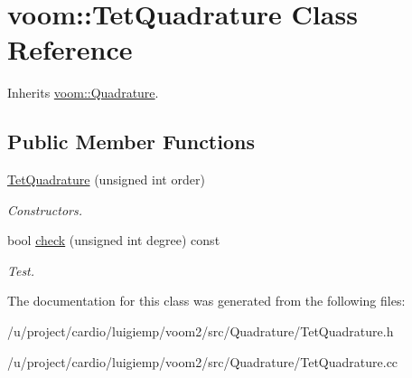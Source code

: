 \hypertarget{classvoom_1_1_tet_quadrature}{
\section{voom::TetQuadrature Class Reference}
\label{classvoom_1_1_tet_quadrature}
}


Inherits \hyperlink{classvoom_1_1_quadrature}{voom::Quadrature}.\subsection*{Public Member Functions}
\begin{DoxyCompactItemize}
\item 
\hypertarget{classvoom_1_1_tet_quadrature_afb15d49b3ab9b74e3e2cfb578df01edd}{
\hyperlink{classvoom_1_1_tet_quadrature_afb15d49b3ab9b74e3e2cfb578df01edd}{TetQuadrature} (unsigned int order)}
\label{classvoom_1_1_tet_quadrature_afb15d49b3ab9b74e3e2cfb578df01edd}

\begin{DoxyCompactList}\small\item\em Constructors. \item\end{DoxyCompactList}\item 
\hypertarget{classvoom_1_1_tet_quadrature_ace08644853d3635368344c9eeda1072f}{
bool \hyperlink{classvoom_1_1_tet_quadrature_ace08644853d3635368344c9eeda1072f}{check} (unsigned int degree) const }
\label{classvoom_1_1_tet_quadrature_ace08644853d3635368344c9eeda1072f}

\begin{DoxyCompactList}\small\item\em Test. \item\end{DoxyCompactList}\end{DoxyCompactItemize}


The documentation for this class was generated from the following files:\begin{DoxyCompactItemize}
\item 
/u/project/cardio/luigiemp/voom2/src/Quadrature/TetQuadrature.h\item 
/u/project/cardio/luigiemp/voom2/src/Quadrature/TetQuadrature.cc\end{DoxyCompactItemize}
